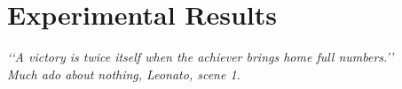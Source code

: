 \chapter{Experimental Results}\label{ch:results}

\begin{flushright}
	\emph{\lq\lq A victory is twice itself when the achiever brings home full numbers.\rq\rq \\
		       \emph{Much ado about nothing}, Leonato, scene 1.}
\end{flushright}

\vspace{0.6cm}
%


